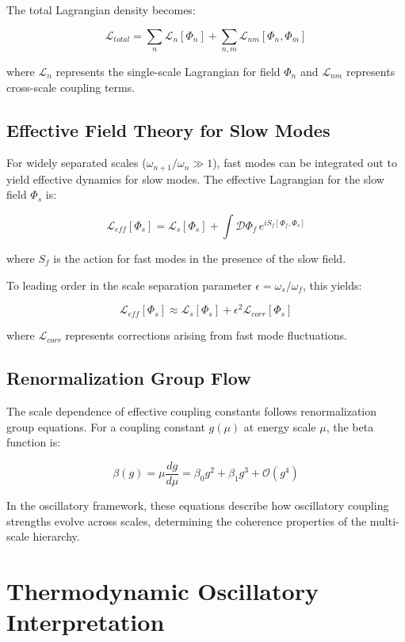 \documentclass[11pt]{article}
\theoremstyle{remark}
\begin{document}
The total Lagrangian density becomes:

$$\mathcal{L}_{total} = \sum_n \mathcal{L}_n[\Phi_n] + \sum_{n,m} \mathcal{L}_{nm}[\Phi_n, \Phi_m]$$

where $\mathcal{L}_n$ represents the single-scale Lagrangian for field $\Phi_n$ and $\mathcal{L}_{nm}$ represents cross-scale coupling terms.

\subsection{Effective Field Theory for Slow Modes}

For widely separated scales ($\omega_{n+1}/\omega_n \gg 1$), fast modes can be integrated out to yield effective dynamics for slow modes. The effective Lagrangian for the slow field $\Phi_s$ is:

$$\mathcal{L}_{eff}[\Phi_s] = \mathcal{L}_s[\Phi_s] + \int \mathcal{D}\Phi_f \, e^{iS_f[\Phi_f, \Phi_s]}$$

where $S_f$ is the action for fast modes in the presence of the slow field.

To leading order in the scale separation parameter $\epsilon = \omega_s/\omega_f$, this yields:

$$\mathcal{L}_{eff}[\Phi_s] \approx \mathcal{L}_s[\Phi_s] + \epsilon^2 \mathcal{L}_{corr}[\Phi_s]$$

where $\mathcal{L}_{corr}$ represents corrections arising from fast mode fluctuations.

\subsection{Renormalization Group Flow}

The scale dependence of effective coupling constants follows renormalization group equations. For a coupling constant $g(\mu)$ at energy scale $\mu$, the beta function is:

$$\beta(g) = \mu \frac{dg}{d\mu} = \beta_0 g^2 + \beta_1 g^3 + \mathcal{O}(g^4)$$

In the oscillatory framework, these equations describe how oscillatory coupling strengths evolve across scales, determining the coherence properties of the multi-scale hierarchy.

\section{Thermodynamic Oscillatory Interpretation}
\end{document}
